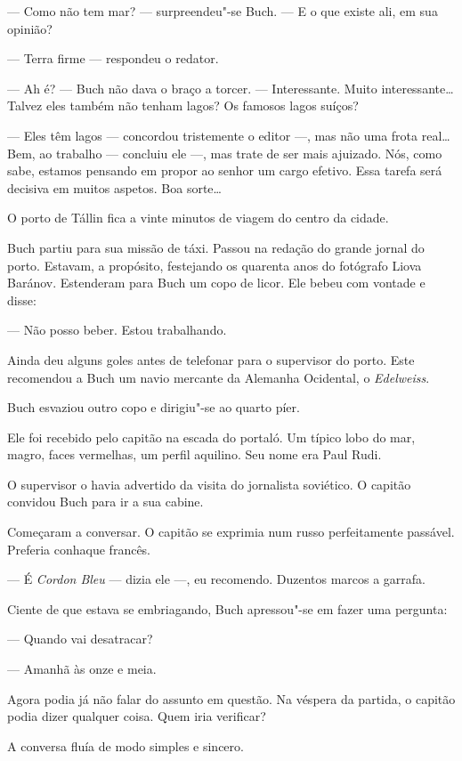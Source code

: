 --- Como não tem mar? --- surpreendeu"-se Buch. --- E o que existe ali,
em sua opinião?

--- Terra firme --- respondeu o redator.

--- Ah é? --- Buch não dava o braço a torcer. --- Interessante. Muito
interessante\ldots{} Talvez eles também não tenham lagos? Os famosos lagos
suíços?

--- Eles têm lagos --- concordou tristemente o editor ---, mas não uma
frota real\ldots{} Bem, ao trabalho --- concluiu ele ---, mas trate de ser
mais ajuizado. Nós, como sabe, estamos pensando em propor ao senhor um
cargo efetivo. Essa tarefa será decisiva em muitos aspetos. Boa sorte\ldots{}

O porto de Tállin fica a vinte minutos de viagem do centro da cidade.

Buch partiu para sua missão de táxi. Passou na redação do grande jornal
do porto. Estavam, a propósito, festejando os quarenta anos do fotógrafo
Liova Baránov. Estenderam para Buch um copo de licor. Ele bebeu com
vontade e disse:

--- Não posso beber. Estou trabalhando.

Ainda deu alguns goles antes de telefonar para o supervisor do porto.
Este recomendou a Buch um navio mercante da Alemanha Ocidental, o
\emph{Edelweiss}.

Buch esvaziou outro copo e dirigiu"-se ao quarto píer.

Ele foi recebido pelo capitão na escada do portaló. Um típico lobo do
mar, magro, faces vermelhas, um perfil aquilino. Seu nome era Paul Rudi.

O supervisor o havia advertido da visita do jornalista soviético. O
capitão convidou Buch para ir a sua cabine.

Começaram a conversar. O capitão se exprimia num russo perfeitamente
passável. Preferia conhaque francês.

--- É \emph{Cordon Bleu} --- dizia ele ---, eu recomendo. Duzentos
marcos a garrafa.

Ciente de que estava se embriagando, Buch apressou"-se em fazer uma
pergunta:

--- Quando vai desatracar?

--- Amanhã às onze e meia.

Agora podia já não falar do assunto em questão. Na véspera da partida, o
capitão podia dizer qualquer coisa. Quem iria verificar?

A conversa fluía de modo simples e sincero.

